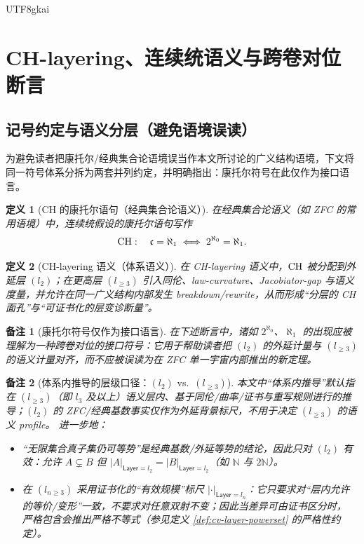 \documentclass[12pt]{article}
\newtheorem{definition}{定义}[section]
\newtheorem{remark}{备注}[section]
\begin{document}
\begin{CJK*}{UTF8}{gkai}
\section{CH-layering、连续统语义与跨卷对位断言}

\subsection{记号约定与语义分层（避免语境误读）}

为避免读者把康托尔/经典集合论语境误当作本文所讨论的广义结构语境，下文将同一符号体系分拆为两套并列约定，并明确指出：康托尔符号在此仅作为接口语言。

\begin{definition}[CH 的康托尔语句（经典集合论语义）]
在经典集合论语义（如 ZFC 的常用语境）中，连续统假设的康托尔语句写作
\[
  \mathrm{CH}:\quad \mathfrak c=\aleph_1\iff 2^{\aleph_0}=\aleph_1.
\]
\end{definition}

\begin{definition}[CH-layering 语义（体系语义）]
在 CH-layering 语义中，$\mathrm{CH}$ 被分配到外延层 $(l_2)$；在更高层 $(l_{\ge3})$ 引入同伦、law-curvature、Jacobiator-gap 与语义度量，并允许在同一广义结构内部发生
  breakdown/rewrite，从而形成“分层的 CH 面孔”与“可证书化的层变诊断量”。
\end{definition}

\begin{remark}[康托尔符号仅作为接口语言]
在下述断言中，诸如 $2^{\aleph_0}$、$\aleph_1$ 的出现应被理解为一种跨卷对位的\emph{接口符号}：它用于帮助读者把 $(l_2)$ 的外延计量与 $(l_{\ge3})$ 的语义计量对齐，而不应被误读为在 ZFC
  单一宇宙内部推出的新定理。
\end{remark}

\begin{remark}[体系内推导的层级口径：$(l_2)$ vs.\ $(l_{\ge3})$]\label{rem:cv-proper-subset-equipotent-l2}
本文中“体系内推导”默认指在 $(l_{\ge3})$（即 $l_3$ 及以上）语义层内、基于同伦/曲率/证书与重写规则进行的推导；$(l_2)$ 的 ZFC/经典基数事实仅作为外延背景标尺，不用于决定 $(l_{\ge3})$ 的语义
  profile。
进一步地：
\begin{itemize}
  \item “无限集合真子集仍可等势”是经典基数/外延等势的结论，因此只对 $(l_2)$ 有效：允许 $A\subsetneq B$ 但 $|A|_{\mathsf{Layer}=l_2}=|B|_{\mathsf{Layer}
    =l_2}$（如 $\mathbb N$ 与 $2\mathbb N$）。
  \item 在 $(l_{n\ge3})$ 采用证书化的“有效规模”标尺 $|\cdot|_{\mathsf{Layer}=l_n}$：它只要求对“层内允许的等价/变形”一致，不要求对任意双射不变；因此当差异可由证书区分时，
    严格包含会推出严格不等式（参见定义 \ref{def:cv-layer-powerset} 的严格性约定）。
\end{itemize}
\end{remark}


\end{CJK*}
\end{document}
